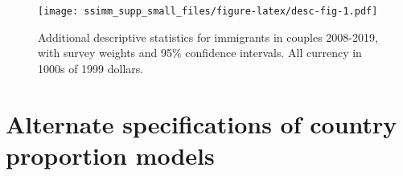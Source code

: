 \documentclass[
  11pt,
]{article}
\begin{document}
\begin{figure}
\centering
\texttt{[image: ssimm\_supp\_small\_files/figure-latex/desc-fig-1.pdf]}
\caption{\label{fig:desc-fig}Additional descriptive statistics for immigrants in couples 2008-2019, with survey weights and 95\% confidence intervals. All currency in 1000s of 1999 dollars.}
\end{figure}

\newpage

\hypertarget{alternate-specifications-of-country-proportion-models}{%
\section{Alternate specifications of country proportion models}\label{alternate-specifications-of-country-proportion-models}}
\end{document}

